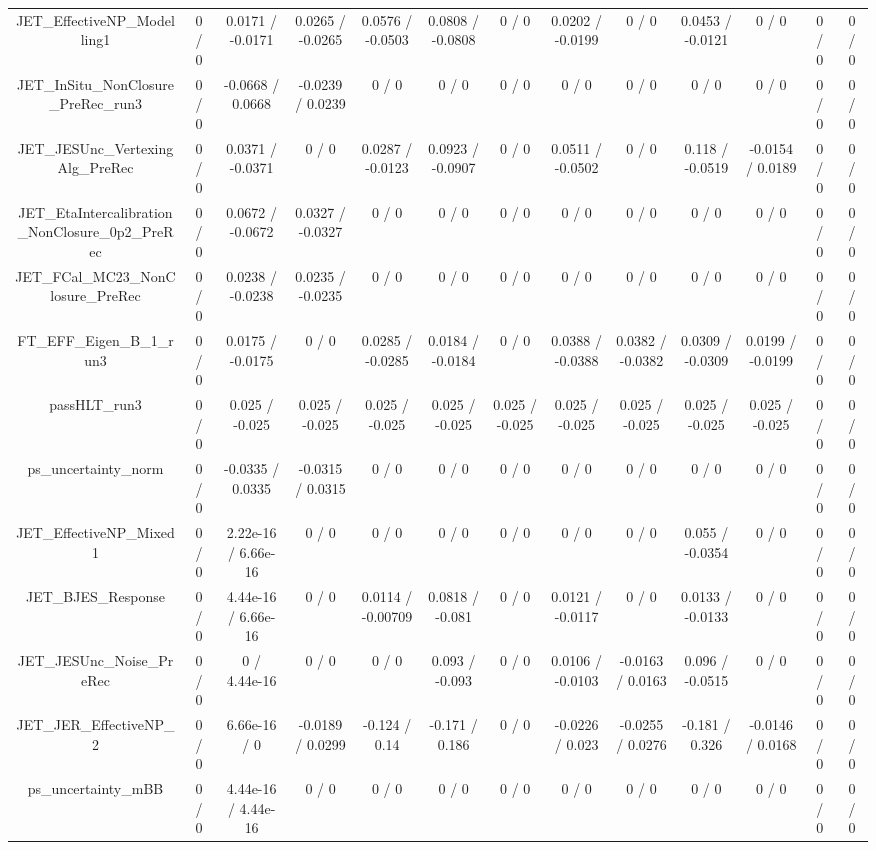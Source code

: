 \documentclass[10pt]{article}
\begin{document}
\begin{table}[htbp]
\begin{center}
\begin{tabular}{|c|c|c|c|c|c|c|c|c|c|c|c|c|}
  JET_EffectiveNP_Modelling1 & 0 / 0 & 0.0171 / -0.0171 & 0.0265 / -0.0265 & 0.0576 / -0.0503 & 0.0808 / -0.0808 & 0 / 0 & 0.0202 / -0.0199 & 0 / 0 & 0.0453 / -0.0121 & 0 / 0 & 0 / 0 & 0 / 0 \\ 
  JET_InSitu_NonClosure_PreRec_run3 & 0 / 0 & -0.0668 / 0.0668 & -0.0239 / 0.0239 & 0 / 0 & 0 / 0 & 0 / 0 & 0 / 0 & 0 / 0 & 0 / 0 & 0 / 0 & 0 / 0 & 0 / 0 \\ 
  JET_JESUnc_VertexingAlg_PreRec & 0 / 0 & 0.0371 / -0.0371 & 0 / 0 & 0.0287 / -0.0123 & 0.0923 / -0.0907 & 0 / 0 & 0.0511 / -0.0502 & 0 / 0 & 0.118 / -0.0519 & -0.0154 / 0.0189 & 0 / 0 & 0 / 0 \\ 
  JET_EtaIntercalibration_NonClosure_0p2_PreRec & 0 / 0 & 0.0672 / -0.0672 & 0.0327 / -0.0327 & 0 / 0 & 0 / 0 & 0 / 0 & 0 / 0 & 0 / 0 & 0 / 0 & 0 / 0 & 0 / 0 & 0 / 0 \\ 
  JET_FCal_MC23_NonClosure_PreRec & 0 / 0 & 0.0238 / -0.0238 & 0.0235 / -0.0235 & 0 / 0 & 0 / 0 & 0 / 0 & 0 / 0 & 0 / 0 & 0 / 0 & 0 / 0 & 0 / 0 & 0 / 0 \\ 
  FT_EFF_Eigen_B_1_run3 & 0 / 0 & 0.0175 / -0.0175 & 0 / 0 & 0.0285 / -0.0285 & 0.0184 / -0.0184 & 0 / 0 & 0.0388 / -0.0388 & 0.0382 / -0.0382 & 0.0309 / -0.0309 & 0.0199 / -0.0199 & 0 / 0 & 0 / 0 \\ 
  passHLT_run3 & 0 / 0 & 0.025 / -0.025 & 0.025 / -0.025 & 0.025 / -0.025 & 0.025 / -0.025 & 0.025 / -0.025 & 0.025 / -0.025 & 0.025 / -0.025 & 0.025 / -0.025 & 0.025 / -0.025 & 0 / 0 & 0 / 0 \\ 
  ps_uncertainty_norm & 0 / 0 & -0.0335 / 0.0335 & -0.0315 / 0.0315 & 0 / 0 & 0 / 0 & 0 / 0 & 0 / 0 & 0 / 0 & 0 / 0 & 0 / 0 & 0 / 0 & 0 / 0 \\ 
  JET_EffectiveNP_Mixed1 & 0 / 0 & 2.22e-16 / 6.66e-16 & 0 / 0 & 0 / 0 & 0 / 0 & 0 / 0 & 0 / 0 & 0 / 0 & 0.055 / -0.0354 & 0 / 0 & 0 / 0 & 0 / 0 \\ 
  JET_BJES_Response & 0 / 0 & 4.44e-16 / 6.66e-16 & 0 / 0 & 0.0114 / -0.00709 & 0.0818 / -0.081 & 0 / 0 & 0.0121 / -0.0117 & 0 / 0 & 0.0133 / -0.0133 & 0 / 0 & 0 / 0 & 0 / 0 \\ 
  JET_JESUnc_Noise_PreRec & 0 / 0 & 0 / 4.44e-16 & 0 / 0 & 0 / 0 & 0.093 / -0.093 & 0 / 0 & 0.0106 / -0.0103 & -0.0163 / 0.0163 & 0.096 / -0.0515 & 0 / 0 & 0 / 0 & 0 / 0 \\ 
  JET_JER_EffectiveNP_2 & 0 / 0 & 6.66e-16 / 0 & -0.0189 / 0.0299 & -0.124 / 0.14 & -0.171 / 0.186 & 0 / 0 & -0.0226 / 0.023 & -0.0255 / 0.0276 & -0.181 / 0.326 & -0.0146 / 0.0168 & 0 / 0 & 0 / 0 \\ 
  ps_uncertainty_mBB & 0 / 0 & 4.44e-16 / 4.44e-16 & 0 / 0 & 0 / 0 & 0 / 0 & 0 / 0 & 0 / 0 & 0 / 0 & 0 / 0 & 0 / 0 & 0 / 0 & 0 / 0 \\ 

\end{tabular}
\end{center}
\end{table}
\end{document}
